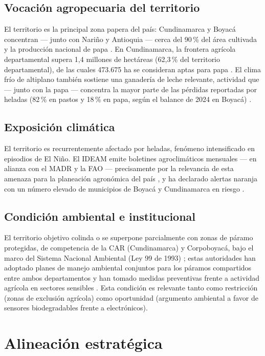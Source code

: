 \documentclass[11pt,a4paper]{article}
\begin{document}
\subsection{Vocación agropecuaria del territorio}
El territorio es la principal zona papera del país: Cundinamarca y Boyacá concentran --- junto con Nariño y Antioquia --- cerca del 90\,\% del área cultivada y la producción nacional de papa \citep{agronet_papa}. En Cundinamarca, la frontera agrícola departamental supera 1,4 millones de hectáreas (62,3\,\% del territorio departamental), de las cuales 473.675 ha se consideran aptas para papa \citep{fedepapa_cundinamarca2023}. El clima frío de altiplano también sostiene una ganadería de leche relevante, actividad que --- junto con la papa --- concentra la mayor parte de las pérdidas reportadas por heladas (82\,\% en pastos y 18\,\% en papa, según el balance de 2024 en Boyacá) \citep{boyaca7dias2026}.

\subsection{Exposición climática}
El territorio es recurrentemente afectado por heladas, fenómeno intensificado en episodios de El Niño. El IDEAM emite boletines agroclimáticos mensuales --- en alianza con el MADR y la FAO --- precisamente por la relevancia de esta amenaza para la planeación agronómica del país \citep{ideam_ban}, y ha declarado alertas naranja con un número elevado de municipios de Boyacá y Cundinamarca en riesgo \citep{elpais_ideam}.

\subsection{Condición ambiental e institucional}
El territorio objetivo colinda o se superpone parcialmente con zonas de páramo protegidas, de competencia de la CAR (Cundinamarca) y Corpoboyacá, bajo el marco del Sistema Nacional Ambiental (Ley 99 de 1993) \citep{ley99_1993,car_acuerdo16_1998}; estas autoridades han adoptado planes de manejo ambiental conjuntos para los páramos compartidos entre ambos departamentos y han tomado medidas preventivas frente a actividad agrícola en sectores sensibles \citep{corpoboyaca_car_paramo}. Esta condición es relevante tanto como restricción (zonas de exclusión agrícola) como oportunidad (argumento ambiental a favor de sensores biodegradables frente a electrónicos).

\section{Alineación estratégica}
\label{sec:alineacion}
\end{document}
